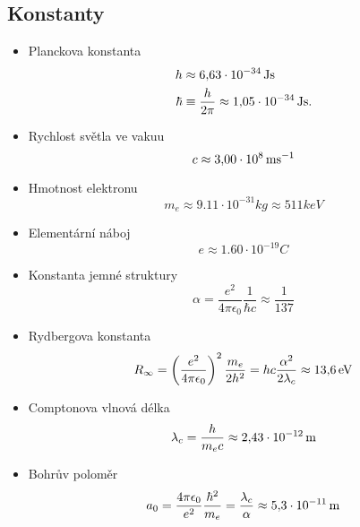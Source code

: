 \subsection{Konstanty}
\begin{itemize}
    \item Planckova konstanta
        \begin{align}
            h&\approx6,\!63\cdot 10^{-34}\,\mathrm{{Js}}\\
            \hbar&\equiv\frac{h}{2\pi}\approx1,\!05\cdot 10^{-34}\,\mathrm{{Js}}.
        \end{align}

    \item Rychlost světla ve vakuu
        \begin{equation}
            c\approx 3,\!00\cdot 10^{8}\,\mathrm{{ms^{-1}}}
        \end{equation}
    
    \item Hmotnost elektronu
        \begin{equation}
            m_{e}\approx 9.11\cdot 10^{-31}\unit{kg}\approx 511\unit{keV}
        \end{equation}

    \item Elementární náboj
        \begin{equation}
            e\approx 1.60\cdot 10^{-19}\unit{C}
        \end{equation}

    \item Konstanta jemné struktury
        \begin{equation}
            \alpha=\frac{e^{2}}{4\pi\epsilon_{0}}\frac{1}{\hbar c}\approx\frac{1}{137}
        \end{equation}

    \item Rydbergova konstanta
        \begin{equation}
            R_{\infty}=\left(\frac{e^{2}}{4\pi\epsilon_{0}}\right)^{2}\frac{m_{e}}{2h^{2}}=hc\frac{\alpha^{2}}{2\lambda_{c}}\approx 13,\!6\,\mathrm{{eV}}
        \end{equation}

    \item Comptonova vlnová délka
        \begin{equation}
            \lambda_{c}=\frac{h}{m_{e}c}\approx2,\!43\cdot10^{-12}\,\mathrm{{m}}
        \end{equation}

    \item Bohrův poloměr
        \begin{equation}
            a_{0}=\frac{4\pi\epsilon_{0}}{e^{2}}\frac{\hbar^{2}}{m_{e}}=\frac{\lambda_{c}}{\alpha}\approx5,\!3\cdot10^{-11}\,\mathrm{{m}}
        \end{equation}


\end{itemize}
